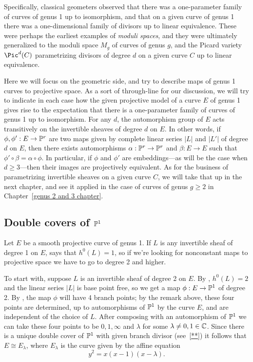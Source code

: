 Specifically, classical geometers observed that there was a one-parameter family of curves of genus 1 up to isomorphism, and that on a given curve of genus 1 there was a one-dimensional family of divisors up to linear equivalence. These were perhaps the earliest examples of \emph{moduli spaces}, and they were ultimately generalized to the moduli space $M_g$ of curves of genus $g$, and the Picard variety $\Pic^d(C)$ parametrizing divisors of degree $d$ on a given curve $C$ up to linear equivalence.

 Here we will focus on the geometric side, and try to describe maps of genus 1 curves to projective space. As a sort of through-line for our discussion, we will try to indicate in each case how the given projective model of a curve $E$ of genus 1 gives rise to the expectation that there is a one-parameter family of curves of genus 1 up to isomorphism. For any $d$, the automorphism group of $E$ acts transitively on the invertible sheaves of degree $d$ on $E$. In other words, if $\phi, \phi' : E \to \PP^r$ are two maps given by complete linear series $|L|$ and $|L'|$ of degree $d$ on $E$, then there exists  automorphisms $\alpha : \PP^r \to \PP^r$ and $\beta : E \to E$ such that $\phi' \circ \beta= \alpha \circ \phi$. In particular, if $\phi$ and $\phi'$ are embeddings---as will be the case when $d \geq 3$---then their images are projectively equivalent. As for the business of parametrizing invertible sheaves on a given curve $C$, we will take that up in the next chapter, and see it applied in the case of curves of genus $g \geq 2$ in Chapter~\ref{genus 2 and 3 chapter}.

\subsection{Double covers of $\PP^1$}

Let $E$ be a smooth projective curve of genus 1. If $L$ is any invertible sheaf of degree 1 on $E$, \trr says that $h^0(L) = 1$, so if we're looking for nonconstant maps to projective space we have to go to degree 2 and higher.

To start with, suppose $L$ is an invertible sheaf of degree 2 on $E$. By \trr, $h^0(L) = 2$ and the linear series $|L|$ is base point free, so we get a map $\phi : E \to \PP^1$ of degree 2. By \trh, the map $\phi$ will have 4 branch points; by the remark above, these four points are determined, up to automorphisms of $\PP^1$ by the curve $E$, and are independent of the choice of $L$.
After composing with an automorphism of $\PP^1$ we can take these four points to be $0, 1, \infty$ and $\lambda$ for some $\lambda \neq 0, 1 \in \CC$. Since there is a unique double cover of $\PP^1$ with given branch divisor (see~\ref{**}) it follows that $E \cong E_\lambda$, where $E_\lambda$ is the curve given by the affine equation
$$
y^2 = x(x-1)(x-\lambda).
$$

